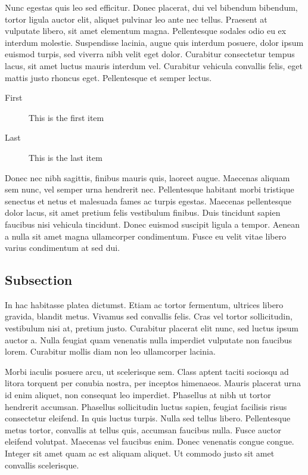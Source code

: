 \documentclass[10pt, a4paper, twocolumn]{article} %
\begin{document}
Nunc egestas quis leo sed efficitur. Donec placerat, dui vel bibendum bibendum, tortor ligula auctor elit, aliquet pulvinar leo ante nec tellus. Praesent at vulputate libero, sit amet elementum magna. Pellentesque sodales odio eu ex interdum molestie. Suspendisse lacinia, augue quis interdum posuere, dolor ipsum euismod turpis, sed viverra nibh velit eget dolor. Curabitur consectetur tempus lacus, sit amet luctus mauris interdum vel. Curabitur vehicula convallis felis, eget mattis justo rhoncus eget. Pellentesque et semper lectus.

\begin{description}
	\item[First] This is the first item
	\item[Last] This is the last item
\end{description}

Donec nec nibh sagittis, finibus mauris quis, laoreet augue. Maecenas aliquam sem nunc, vel semper urna hendrerit nec. Pellentesque habitant morbi tristique senectus et netus et malesuada fames ac turpis egestas. Maecenas pellentesque dolor lacus, sit amet pretium felis vestibulum finibus. Duis tincidunt sapien faucibus nisi vehicula tincidunt. Donec euismod suscipit ligula a tempor. Aenean a nulla sit amet magna ullamcorper condimentum. Fusce eu velit vitae libero varius condimentum at sed dui.


\subsection{Subsection}

In hac habitasse platea dictumst. Etiam ac tortor fermentum, ultrices libero gravida, blandit metus. Vivamus sed convallis felis. Cras vel tortor sollicitudin, vestibulum nisi at, pretium justo. Curabitur placerat elit nunc, sed luctus ipsum auctor a. Nulla feugiat quam venenatis nulla imperdiet vulputate non faucibus lorem. Curabitur mollis diam non leo ullamcorper lacinia.

Morbi iaculis posuere arcu, ut scelerisque sem. Class aptent taciti sociosqu ad litora torquent per conubia nostra, per inceptos himenaeos. Mauris placerat urna id enim aliquet, non consequat leo imperdiet. Phasellus at nibh ut tortor hendrerit accumsan. Phasellus sollicitudin luctus sapien, feugiat facilisis risus consectetur eleifend. In quis luctus turpis. Nulla sed tellus libero. Pellentesque metus tortor, convallis at tellus quis, accumsan faucibus nulla. Fusce auctor eleifend volutpat. Maecenas vel faucibus enim. Donec venenatis congue congue. Integer sit amet quam ac est aliquam aliquet. Ut commodo justo sit amet convallis scelerisque.
\end{document}
